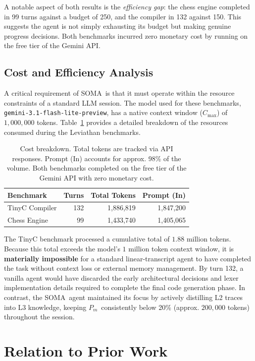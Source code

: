 \documentclass[11pt,a4paper]{article}
\newcommand{\soma}{\textsc{SOMA}}
\newcommand{\Pm}{\ensuremath{P_m}}
\begin{document}
A notable aspect of both results is the \emph{efficiency gap}: the chess
engine completed in 99 turns against a budget of 250, and the compiler
in 132 against 150.
This suggests the agent is not simply exhausting its budget but making
genuine progress decisions.
Both benchmarks incurred zero monetary cost by running on the free tier
of the Gemini API.

\subsection{Cost and Efficiency Analysis}

A critical requirement of \soma\ is that it must operate within the
resource constraints of a standard LLM session.
The model used for these benchmarks, \texttt{gemini-3.1-flash-lite-preview},
has a native context window ($C_{\max}$) of $1{,}000{,}000$ tokens.
Table~\ref{tab:cost_analysis} provides a detailed breakdown of the
resources consumed during the Leviathan benchmarks.

\begin{table}[h]
\centering
\begin{tabular}{lrrr}
\toprule
Benchmark & Turns & Total Tokens & Prompt (In) \\
\midrule
TinyC Compiler & 132 & 1{,}886{,}819 & 1{,}847{,}200 \\
Chess Engine   &  99 & 1{,}433{,}740 & 1{,}405{,}065 \\
\bottomrule
\end{tabular}
\caption{Cost breakdown. Total tokens are tracked via API
  responses. Prompt (In) accounts for approx. 98\% of the volume.
  Both benchmarks completed on the free tier of the Gemini API
  with zero monetary cost.}
\label{tab:cost_analysis}
\end{table}

The TinyC benchmark processed a cumulative total of $1.88$ million tokens.
Because this total exceeds the model's $1$ million token context window,
it is \textbf{materially impossible} for a standard linear-transcript
agent to have completed the task without context loss or external
memory management.
By turn 132, a vanilla agent would have discarded the early architectural
decisions and lexer implementation details required to complete the final
code generation phase.
In contrast, the \soma\ agent maintained its focus by actively
distilling L2 traces into L3 knowledge, keeping \Pm\ consistently
below 20\% (approx. $200{,}000$ tokens) throughout the session.

\section{Relation to Prior Work}
\end{document}
